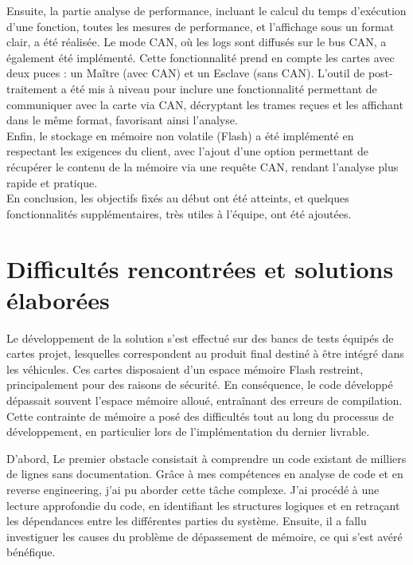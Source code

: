 \documentclass[a4paper, 12pt]{report}
\begin{document}
Ensuite, la partie analyse de performance, incluant le calcul du temps d’exécution d’une fonction, toutes les mesures de performance, et l’affichage sous un format clair, a été réalisée. Le mode CAN, où les logs sont diffusés sur le bus CAN, a également été implémenté. Cette fonctionnalité prend en compte les cartes avec deux puces : un Maître (avec CAN) et un Esclave (sans CAN). L’outil de post-traitement a été mis à niveau pour inclure une fonctionnalité permettant de communiquer avec la carte via CAN, décryptant les trames reçues et les affichant dans le même format, favorisant ainsi l’analyse.\\

Enfin, le stockage en mémoire non volatile (Flash) a été implémenté en respectant les exigences du client, avec l’ajout d’une option permettant de récupérer le contenu de la mémoire via une requête CAN, rendant l’analyse plus rapide et pratique.\\

En conclusion, les objectifs fixés au début ont été atteints, et quelques fonctionnalités supplémentaires, très utiles à l’équipe, ont été ajoutées.\\


\section{Difficultés rencontrées et solutions élaborées}
Le développement de la solution s'est effectué sur des bancs de tests équipés de cartes projet, lesquelles correspondent au produit final destiné à être intégré dans les véhicules. Ces cartes disposaient d'un espace mémoire Flash restreint, principalement pour des raisons de sécurité. En conséquence, le code développé dépassait souvent l'espace mémoire alloué, entraînant des erreurs de compilation. Cette contrainte de mémoire a posé des difficultés tout au long du processus de développement, en particulier lors de l'implémentation du dernier livrable.


D'abord, Le premier obstacle consistait à comprendre un code existant de milliers de lignes sans documentation. Grâce à mes compétences en analyse de code et en reverse engineering, j'ai pu aborder cette tâche complexe. J'ai procédé à une lecture approfondie du code, en identifiant les structures logiques et en retraçant les dépendances entre les différentes parties du système. Ensuite, il a fallu investiguer les causes du problème de dépassement de mémoire, ce qui s'est avéré bénéfique.\\
\end{document}
